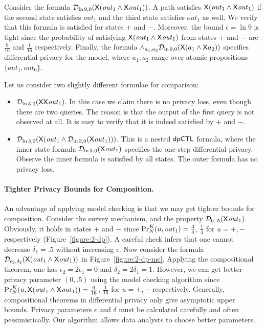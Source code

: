 Consider the formula $\dpriv{\ln 9}{0} (\X (\mathit{out}_1\wedge \X \mathit{out}_1))$. A path satisfies $\X (\mathit{out}_1\wedge \X \mathit{out}_1)$ if the second state satisfies $\mathit{out}_1$ and the third state satisfies $\mathit{out}_1$ as well. We verify that this formula is satisfied for states $+$ and $-$. Moreover, the bound $\epsilon=\ln 9$ is tight since the probability of satisfying $\X (\mathit{out}_1\wedge \X \mathit{out}_1)$ from states $+$ and $-$ are $\frac{9}{16}$ and $\frac{1}{16}$ respectively. Finally, the formula $\wedge_{a_1,a_2}\dpriv{\ln 9}{0} (\X (a_1\wedge \X a_2))$ specifies differential privacy for the model, where $a_1,a_2$ range over atomic propositions $\{\mathit{out}_1, \mathit{out}_0\}$.

Let us consider two slightly different formulae for comparison:
\begin{itemize}
\item $\dpriv{\ln 3}{0} (\X \X \mathit{out}_1)$. In this case we claim
  there is no privacy loss, even though there are two queries. The reason is that the output of the first query is not observed at all. It is easy to verify that it is indeed satisfied by $+$ and $-$.
\item $\dpriv{\ln 3}{0} (\X (\mathit{out}_1\wedge \dpriv{\ln 3}{0}(\X \mathit{out}_1)))$. This is a nested $\dpCTL$ formula, where the inner state formula $\dpriv{\ln 3}{0}(\X \mathit{out}_1)$ specifies the one-step differential privacy. Observe the inner formula is satisfied by all states. The outer formula has no privacy loss.
\end{itemize}

\paragraph{Tighter Privacy Bounds for Composition.}
An advantage of applying model checking is that we may get tighter
bounds for composition. Consider the survey mechanism, and the
property $\dpriv{0}{.5} (\X \mathit{out}_1)$. Obviously, it holds in
states $+$ and $-$ since $\myPr{u}{K}{N}{\mathit{out}_1} =
\frac{3}{4}$, $\frac{1}{4}$ for $u = +, -$ respectively (Figure~\ref{figure:2-dp}). A careful check infers that one cannot decrease  $\delta_1=.5$ without increasing $\epsilon$.
Now consider the formula $\dpriv{\epsilon_2}{\delta_2} (\X
(\mathit{out}_1\wedge \X \mathit{out}_1))$ in
Figure~\ref{figure:2-dp-mc}. Applying the
compositional theorem, one has $\epsilon_2=2\epsilon_1=0$ and
$\delta_2=2\delta_1=1$. However, we can get
better privacy parameter $(0,.5)$ using the model checking algorithm
since $\myPr{u}{K}{N}{\X (\mathit{out}_1 \wedge \X\mathit{out}_1)}
= \frac{9}{16}$, $\frac{1}{16}$ for $u = +, -$ respectively.
Generally, compositional theorems in differential privacy only give
asymptotic upper bounds. Privacy parameters $\epsilon$ and $\delta$
must be calculated carefully and often pessimistically. Our
algorithm allows data analysts to choose better parameters.

